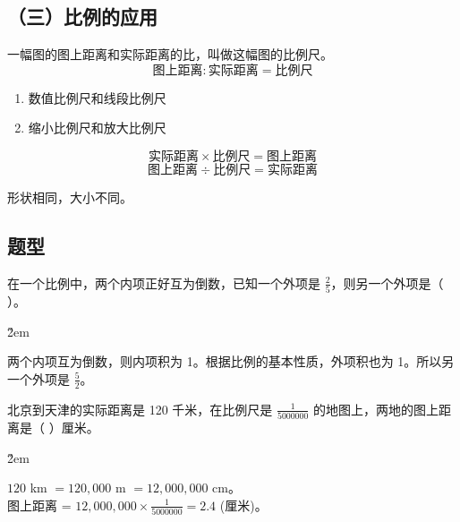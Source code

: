 \subsection*{（三）比例的应用}

\begin{definition}[比例尺]
    一幅图的图上距离和实际距离的比，叫做这幅图的比例尺。
    $$ \text{图上距离} : \text{实际距离} = \text{比例尺} $$
\end{definition}

\begin{tips}[比例尺的分类]
    \begin{enumerate}
        \item 数值比例尺和线段比例尺
        \item 缩小比例尺和放大比例尺
    \end{enumerate}
\end{tips}

\begin{theorem}[比例尺相关计算]
    $$ \text{实际距离} \times \text{比例尺} = \text{图上距离} $$
    $$ \text{图上距离} \div \text{比例尺} = \text{实际距离} $$
\end{theorem}


\begin{definition}[图形的放大与缩小]
    形状相同，大小不同。
\end{definition}

\subsection*{题型}
\begin{example}
    在一个比例中，两个内项正好互为倒数，已知一个外项是 $\frac{2}{5}$，则另一个外项是（ \quad ）。
\end{example}

\v{2em}

\begin{solution}
    两个内项互为倒数，则内项积为 1。根据比例的基本性质，外项积也为 1。所以另一个外项是 $\frac{5}{2}$。
\end{solution}

\begin{example}
    北京到天津的实际距离是 120 千米，在比例尺是 $\frac{1}{5000000}$ 的地图上，两地的图上距离是（ \quad ）厘米。
\end{example}

\v{2em}

\begin{solution}
    $120$ km $= 120,000$ m $= 12,000,000$ cm。\\
    图上距离 = $12,000,000 \times \frac{1}{5000000} = 2.4$ (厘米)。
\end{solution}

